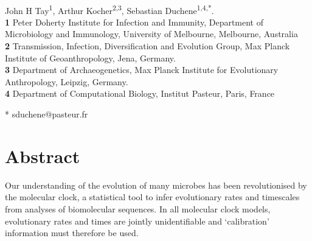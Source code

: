 \documentclass[10pt,letterpaper]{article}
\begin{document}
\vspace*{0.2in}

\begin{flushleft}
{\Large
\textbf{} %
}
\newline
\\
John H Tay\textsuperscript{1},
Arthur Kocher\textsuperscript{2,3},
Sebastian Duchene\textsuperscript{1,4,*}.
\\
\bigskip
\textbf{1} Peter Doherty Institute for Infection and Immunity, Department of Microbiology and Immunology, University of Melbourne, Melbourne, Australia
\\
\textbf{2} Transmission, Infection, Diversification and Evolution Group, Max Planck Institute of Geoanthropology, Jena, Germany.
\\
\textbf{3} Department of Archaeogenetics, Max Planck Institute for Evolutionary Anthropology, Leipzig, Germany.
\\
\textbf{4} Department of Computational Biology, Institut Pasteur, Paris, France
\\
\bigskip

% 


* sduchene@pasteur.fr

\end{flushleft}
\section*{Abstract}
Our understanding of the evolution of many microbes has been revolutionised by the molecular clock, a statistical tool to infer evolutionary rates and timescales from analyses of biomolecular sequences. In all molecular clock models, evolutionary rates and times are jointly unidentifiable and `calibration' information must therefore be used. 
\end{document}
